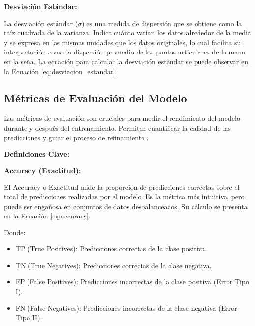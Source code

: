 

\textbf{Desviación Estándar:}

La desviación estándar ($\sigma$) es una medida de dispersión que se obtiene como la raíz cuadrada de la varianza. Indica cuánto varían los datos alrededor de la media y se expresa en las mismas unidades que los datos originales, lo cual facilita su interpretación como la dispersión promedio de los puntos articulares de la mano en la seña. La ecuación para calcular la desviación estándar se puede observar en la Ecuación \ref{eq:desviacion_estandar}.


\subsection{Métricas de Evaluación del Modelo}
\label{sec:metricas_evaluacion}

Las métricas de evaluación son cruciales para medir el rendimiento del modelo durante y después del entrenamiento. Permiten cuantificar la calidad de las predicciones y guiar el proceso de refinamiento \cite{ref44}.

\textbf{Definiciones Clave:}

\textbf{Accuracy (Exactitud):}

El Accuracy o Exactitud mide la proporción de predicciones correctas sobre el total de predicciones realizadas por el modelo. Es la métrica más intuitiva, pero puede ser engañosa en conjuntos de datos desbalanceados. Su cálculo se presenta en la Ecuación \ref{eq:accuracy}.

Donde:
\begin{itemize}
    \item TP (True Positives): Predicciones correctas de la clase positiva.
    \item TN (True Negatives): Predicciones correctas de la clase negativa.
    \item FP (False Positives): Predicciones incorrectas de la clase positiva (Error Tipo I).
    \item FN (False Negatives): Predicciones incorrectas de la clase negativa (Error Tipo II).
\end{itemize}

